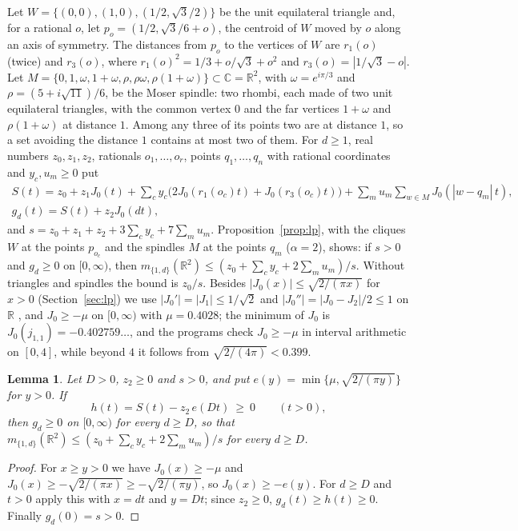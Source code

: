 \documentclass[11pt,a4paper]{amsart}
\newtheorem{lemma}[theorem]{Lemma}
\theoremstyle{definition}
\theoremstyle{remark}
\newcommand{\C}{\mathbb{C}}
\newcommand{\R}{\mathbb{R}}
\begin{document}
Let $W=\{(0,0),(1,0),(1/2,\sqrt3/2)\}$ be the unit equilateral triangle and, for a rational $o$, let
$p_o=(1/2,\sqrt3/6+o)$, the centroid of $W$ moved by $o$ along an axis of symmetry. The distances from $p_o$ to the
vertices of $W$ are $r_1(o)$ (twice) and $r_3(o)$, where $r_1(o)^2=1/3+o/\sqrt3+o^2$ and $r_3(o)=|1/\sqrt3-o|$. Let
$M=\{0,1,\omega,1+\omega,\rho,\rho\omega,\rho(1+\omega)\}\subset\C=\R^2$, with $\omega=e^{i\pi/3}$ and
$\rho=(5+i\sqrt{11})/6$, be the Moser spindle: two rhombi, each made of two unit equilateral triangles, with the common
vertex $0$ and the far vertices $1+\omega$ and $\rho(1+\omega)$ at distance $1$. Among any three of its points two are
at distance $1$, so a set avoiding the distance $1$ contains at most two of them. For $d\ge1$, real numbers
$z_0,z_1,z_2$, rationals $o_1,\dots,o_r$, points $q_1,\dots,q_n$ with rational coordinates and $y_c,u_m\ge0$ put
\begin{gather*}
S(t)=z_0+z_1J_0(t)+\sum_cy_c\bigl(2J_0(r_1(o_c)t)+J_0(r_3(o_c)t)\bigr)+\sum_mu_m\sum_{w\in M}J_0(|w-q_m|\,t),\\
g_d(t)=S(t)+z_2J_0(dt),
\end{gather*}
and $s=z_0+z_1+z_2+3\sum_cy_c+7\sum_mu_m$. Proposition~\ref{prop:lp}, with the cliques $W$ at the points $p_{o_c}$ and
the spindles $M$ at the points $q_m$ ($\alpha=2$), shows: if $s>0$ and $g_d\ge0$ on $[0,\infty)$, then
$m_{\{1,d\}}(\R^2)\le(z_0+\sum_cy_c+2\sum_mu_m)/s$. Without triangles and spindles the bound is $z_0/s$. Besides $|J_0(x)|\le\sqrt{2/(\pi x)}$ for $x>0$ (Section~\ref{sec:lp}) we use
$|J_0'|=|J_1|\le1/\sqrt2$ and $|J_0''|=|J_0-J_2|/2\le1$ on $\R$ \cite[10.14.1]{DLMF}, and $J_0\ge-\mu$ on
$[0,\infty)$ with $\mu=0.4028$; the minimum of $J_0$ is $J_0(j_{1,1})=-0.402759\ldots$, and the programs check
$J_0\ge-\mu$ in interval arithmetic on $[0,4]$, while beyond $4$ it follows from $\sqrt{2/(4\pi)}<0.399$.

\begin{lemma}\label{lem:tail}
Let $D>0$, $z_2\ge0$ and $s>0$, and put $e(y)=\min\{\mu,\sqrt{2/(\pi y)}\}$ for $y>0$. If
\[
h(t)=S(t)-z_2\,e(Dt)\ \ge\ 0\qquad(t>0),
\]
then $g_d\ge0$ on $[0,\infty)$ for every $d\ge D$, so that $m_{\{1,d\}}(\R^2)\le(z_0+\sum_cy_c+2\sum_mu_m)/s$ for every
$d\ge D$.
\end{lemma}

\begin{proof}
For $x\ge y>0$ we have $J_0(x)\ge-\mu$ and $J_0(x)\ge-\sqrt{2/(\pi x)}\ge-\sqrt{2/(\pi y)}$, so $J_0(x)\ge-e(y)$.
For $d\ge D$ and $t>0$ apply this with $x=dt$ and $y=Dt$; since $z_2\ge0$, $g_d(t)\ge h(t)\ge0$. Finally
$g_d(0)=s>0$.
\end{proof}
\end{document}
